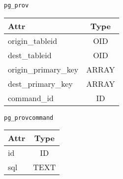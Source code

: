 \begin{figure}
  \centering
  \label{pgprov}
\texttt{pg\_prov}

\begin{tabular}{|lc|}
  \hline
  Attr & Type \\
  \hline
  origin\_tableid & OID \\
  dest\_tableid & OID \\
  origin\_primary\_key & ARRAY \\
  dest\_primary\_key & ARRAY \\
  command\_id & ID \\
  \hline
\end{tabular}

\texttt{pg\_provcommand}
\begin{tabular}{|lc|}
  \hline
  Attr & Type \\
  \hline
  id & ID \\
  sql & TEXT \\
  \hline  
\end{tabular}
\end{figure}
